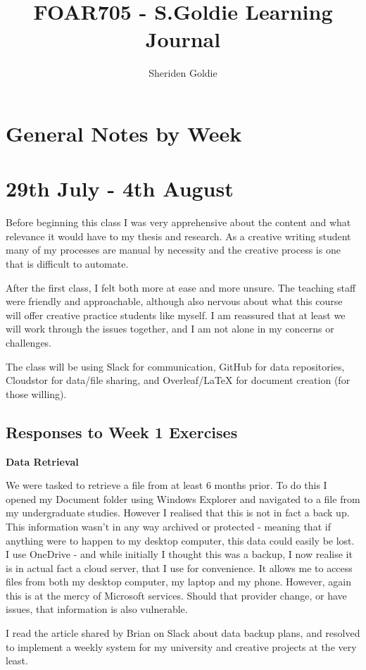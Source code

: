 \documentclass{article}
\title{FOAR705 - S.Goldie Learning Journal}
\author{Sheriden Goldie}
\date{}
\begin{document}
\maketitle


\section*{General Notes by Week}
\section{29th July - 4th August}
Before beginning this class I was very apprehensive about the content and what relevance it would have to my thesis and research. As a creative writing student many of my processes are manual by necessity and the creative process is one that is difficult to automate. 

After the first class, I felt both more at ease and more unsure. The teaching staff were friendly and approachable, although also nervous about what this course will offer creative practice students like myself. I am reassured that at least we will work through the issues together, and I am not alone in my concerns or challenges. 

The class will be using Slack for communication, GitHub for data repositories, Cloudstor for data/file sharing, and Overleaf/LaTeX for document creation (for those willing).

\subsection{Responses to Week 1 Exercises}
\textbf{Data Retrieval}

We were tasked to retrieve a file from at least 6 months prior. 
To do this I opened my Document folder using Windows Explorer and navigated to a file from my undergraduate studies.
However I realised that this is not in fact a back up. This information wasn't in any way archived or protected - meaning that if anything were to happen to my desktop computer, this data could easily be lost.
I use OneDrive - and while initially I thought this was a backup, I now realise it is in actual fact a cloud server, that I use for convenience. It allows me to access files from both my desktop computer, my laptop and my phone. However, again this is at the mercy of Microsoft services. Should that provider change, or have issues, that information is also vulnerable. 

I read the article shared by Brian on Slack about data backup plans, and resolved to implement a weekly system for my university and creative projects at the very least. 
\end{document}
